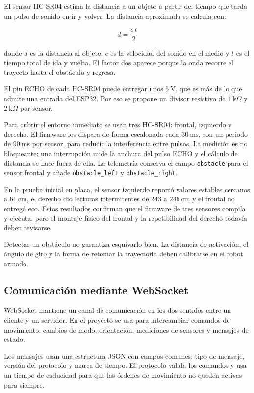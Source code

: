 \documentclass[journal]{IEEEtran}
\begin{document}
El sensor HC-SR04 estima la distancia a un objeto a partir del tiempo que tarda un pulso de sonido en ir y volver. La distancia aproximada se calcula con:

\begin{equation}
d=\frac{c\,t}{2}
\label{eq:distancia_ultrasonica}
\end{equation}

donde $d$ es la distancia al objeto, $c$ es la velocidad del sonido en el medio y $t$ es el tiempo total de ida y vuelta. El factor dos aparece porque la onda recorre el trayecto hasta el obstáculo y regresa.

El pin ECHO de cada HC-SR04 puede entregar unos $5~\mathrm{V}$, que es más de lo que admite una entrada del ESP32. Por eso se propone un divisor resistivo de $1~\mathrm{k}\Omega$ y $2~\mathrm{k}\Omega$ por sensor.

Para cubrir el entorno inmediato se usan tres HC-SR04: frontal, izquierdo y derecho. El firmware los dispara de forma escalonada cada $30~\mathrm{ms}$, con un periodo de $90~\mathrm{ms}$ por sensor, para reducir la interferencia entre pulsos. La medición es no bloqueante: una interrupción mide la anchura del pulso ECHO y el cálculo de distancia se hace fuera de ella. La telemetría conserva el campo \texttt{obstacle} para el sensor frontal y añade \texttt{obstacle\_left} y \texttt{obstacle\_right}.

En la prueba inicial en placa, el sensor izquierdo reportó valores estables cercanos a $61~\mathrm{cm}$, el derecho dio lecturas intermitentes de $243$ a $246~\mathrm{cm}$ y el frontal no entregó eco. Estos resultados confirman que el firmware de tres sensores compila y ejecuta, pero el montaje físico del frontal y la repetibilidad del derecho todavía deben revisarse.

Detectar un obstáculo no garantiza esquivarlo bien. La distancia de activación, el ángulo de giro y la forma de retomar la trayectoria deben calibrarse en el robot armado.

\subsection{Comunicación mediante WebSocket}

WebSocket mantiene un canal de comunicación en los dos sentidos entre un cliente y un servidor. En el proyecto se usa para intercambiar comandos de movimiento, cambios de modo, orientación, mediciones de sensores y mensajes de estado.

Los mensajes usan una estructura JSON con campos comunes: tipo de mensaje, versión del protocolo y marca de tiempo. El protocolo valida los comandos y usa un tiempo de caducidad para que las órdenes de movimiento no queden activas para siempre.
\end{document}
